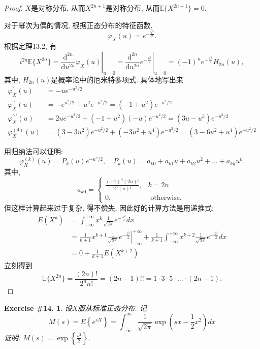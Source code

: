 \documentclass[UTF8, a4paper]{article}
\newtheorem{exercise}{Exercise \#14.}
\begin{document}
\begin{proof}
\(X\)是对称分布, 从而\(X^{2n+1}\)是对称分布, 从而\(\mathbb{E}\{X^{2n+1}\} = 0\).


对于幂次为偶的情况, 根据正态分布的特征函数, 
$$
\varphi_X(u) = e^{-\frac{u^2}{2}}.
$$
根据定理13.2, 有
$$
i^{2n} \mathbb{E}\{X^{2n}\} = \left.\frac{\mathrm{d}^{2n}}{\mathrm{d}u^{2n}} \varphi_X(u) \right|_{u=0}=\left. \frac{\mathrm{d}^{2n}}{\mathrm{d}u^{2n}} e^{-\frac{u^2}{2}} \right|_{u=0}= (-1)^n e^{-\frac{u^2}{2}} H_{2n}(u),
$$
其中, \(H_{2n}(u)\)是概率论中的厄米特多项式. 具体地写出来
$$
\begin{aligned}
\varphi_X^{\prime}(u) & =-u e^{-u^2 / 2} \\
\varphi_X^{\prime \prime}(u) & =-e^{u^2 / 2}+u^2 e^{-u^2 / 2}=\left(-1+u^2\right) e^{-u^2 / 2} \\
\varphi_X^{\prime \prime \prime}(u) & =2 u e^{-u^2 / 2}+\left(-1+u^2\right) (-u) e^{-u^2 / 2}=\left(3 u-u^3\right) e^{-u^2 / 2} \\
\varphi_X^{(4)}(u) & =\left(3 -3u^2\right) e^{-u^2 / 2}+\left(-3 u^2+u^4\right) e^{-u^2 / 2}=\left(3- 6 u^2+u^4\right) e^{-u^2 / 2}
\end{aligned}
$$

用归纳法可以证明:
$$
\varphi_X^{(k)}(u) = P_k(u) e^{-u^2/2}, \quad P_k(u) = a_{k0} + a_{k1}u + a_{k2}u^2 + ... + a_{kk}u^k.
$$
其中, 
$$
a_{k0}= \begin{cases}\frac{(-1)^n(2n)!}{2^{n}(n)!}, & k = 2n  \\ 0, & \text { otherwise. }\end{cases}
$$
但这样计算起来过于复杂, 得不偿失, 因此好的计算方法是用递推式:
$$
\begin{aligned}
E\left(X^k\right) & =\int_{-\infty}^{+\infty} x^k \frac{1}{\sqrt{2 \pi}} e^{-\frac{x^2}{2}} d x \\
& =\left.\frac{1}{k+1} x^{k+1} \frac{1}{\sqrt{2 \pi}} e^{-\frac{x^2}{2}}\right|_{-\infty} ^{+\infty}+\frac{1}{k+1} \int_{-\infty}^{+\infty} x^{k+2} \frac{1}{\sqrt{2 \pi}} e^{-\frac{x^2}{2}} d x \\
& =0+\frac{1}{k+1} E\left(X^{k+2}\right)
\end{aligned}
$$
立刻得到
$$
\mathbb{E}\{X^{2n}\} = \frac{(2n)!}{2^n n!} = (2n - 1)!! = 1 \cdot 3 \cdot 5 \cdot ... \cdot (2n-1). 
$$
\end{proof}

\begin{framed}
\begin{exercise}
设\(X\)服从标准正态分布. 记
$$
M(s)=E\left\{e^{s X}\right\}=\int_{-\infty}^{\infty} \frac{1}{\sqrt{2 \pi}} \exp \left(s x-\frac{1}{2} x^2\right) d x
$$
证明: \(M(s) = \exp\left\{\frac{s^2}{2}\right\}\).
\end{exercise}
\end{framed}
\end{document}
